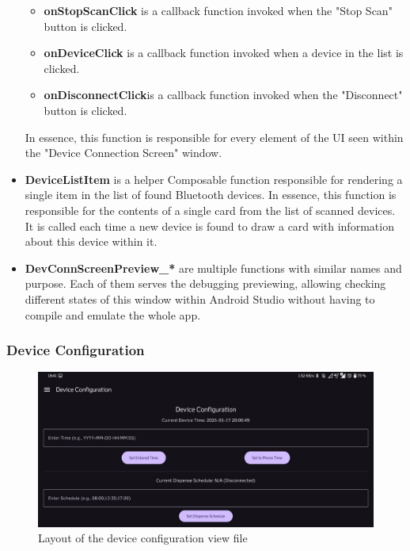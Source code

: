 \begin{itemize}
\begin{itemize}
		\item \textbf{onStopScanClick} is a callback function invoked when the "Stop Scan" button is clicked.
		\item \textbf{onDeviceClick} is a callback function invoked when a device in the list is clicked.
		\item \textbf{onDisconnectClick}is a callback function invoked when the "Disconnect" button is clicked.
	\end{itemize}
	In essence, this function is responsible for every element of the \ac{UI} seen within the "Device Connection Screen" window.
	\item \textbf{DeviceListItem} is a helper Composable function responsible for rendering a single item in the list of found Bluetooth devices. In essence, this function is responsible for the contents of a single card from the list of scanned devices. It is called each time a new device is found to draw a card with information about this device within it.
	\item \textbf{DevConnScreenPreview\_*} are multiple functions with similar names and purpose. Each of them serves the debugging previewing, allowing checking different states of this window within Android Studio without having to compile and emulate the whole app.
\end{itemize}

\subsubsection{Device Configuration}
\begin{figure}
	\centering
	\includegraphics[width=0.9\linewidth]{Figures/devConfView}
	\caption[Device Configuration view.]{Layout of the device configuration view file}
	\label{fig:devconfview}
\end{figure}

